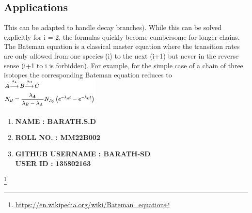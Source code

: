 \documentclass{article}
\begin{document}
\subsection{Applications}
This can be adapted to handle decay branches). While this can be solved explicitly for i = 2, the formulas quickly become cumbersome for longer chains.
The Bateman equation is a classical master equation where the transition rates are only allowed from one species (i) to the next (i+1) but never in the reverse sense (i+1 to i is forbidden). \newline{}
\newline{}
For example, for the simple case of a chain of three isotopes the corresponding Bateman equation reduces to \newline{} \newline{}
\includegraphics[width=5cm]{image.png}
\newline{}
\begin{enumerate}
    \item\textbf{NAME : BARATH.S.D}
    \item\textbf{ROLL NO. : MM22B002}
    \item\textbf{GITHUB USERNAME : BARATH-SD \\ USER ID : 135802163}
\end{enumerate}
\footnote{\url{https://en.wikipedia.org/wiki/Bateman_equation}}
\end{document}
